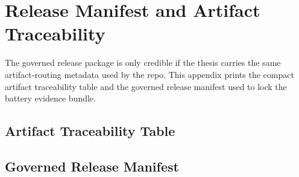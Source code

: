 \chapter{Release Manifest and Artifact Traceability}
\label{app:release-manifest-traceability}

The governed release package is only credible if the thesis carries the same
artifact-routing metadata used by the repo. This appendix prints the compact
artifact traceability table and the governed release manifest used to lock the
battery evidence bundle.

\section{Artifact Traceability Table}



\section{Governed Release Manifest}


